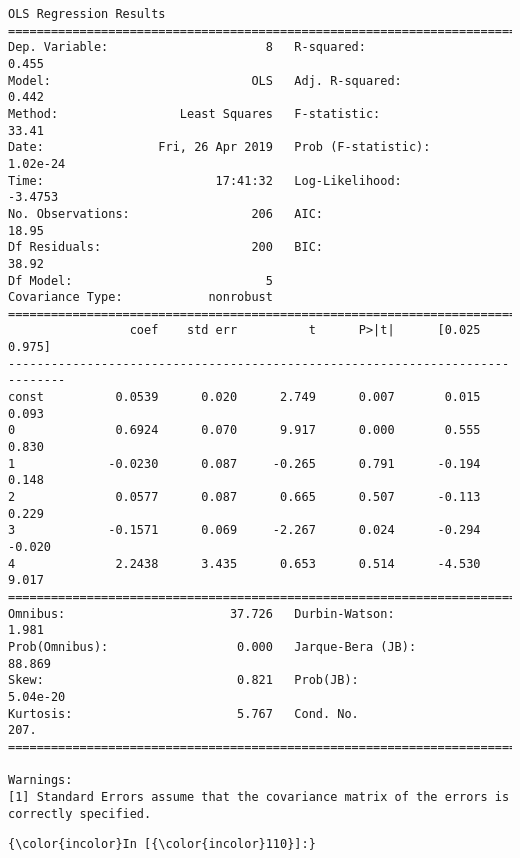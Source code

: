 \documentclass[11pt]{article}
\begin{document}
    \begin{Verbatim}[commandchars=\\\{\}]
                            OLS Regression Results                            
==============================================================================
Dep. Variable:                      8   R-squared:                       0.455
Model:                            OLS   Adj. R-squared:                  0.442
Method:                 Least Squares   F-statistic:                     33.41
Date:                Fri, 26 Apr 2019   Prob (F-statistic):           1.02e-24
Time:                        17:41:32   Log-Likelihood:                -3.4753
No. Observations:                 206   AIC:                             18.95
Df Residuals:                     200   BIC:                             38.92
Df Model:                           5                                         
Covariance Type:            nonrobust                                         
==============================================================================
                 coef    std err          t      P>|t|      [0.025      0.975]
------------------------------------------------------------------------------
const          0.0539      0.020      2.749      0.007       0.015       0.093
0              0.6924      0.070      9.917      0.000       0.555       0.830
1             -0.0230      0.087     -0.265      0.791      -0.194       0.148
2              0.0577      0.087      0.665      0.507      -0.113       0.229
3             -0.1571      0.069     -2.267      0.024      -0.294      -0.020
4              2.2438      3.435      0.653      0.514      -4.530       9.017
==============================================================================
Omnibus:                       37.726   Durbin-Watson:                   1.981
Prob(Omnibus):                  0.000   Jarque-Bera (JB):               88.869
Skew:                           0.821   Prob(JB):                     5.04e-20
Kurtosis:                       5.767   Cond. No.                         207.
==============================================================================

Warnings:
[1] Standard Errors assume that the covariance matrix of the errors is correctly specified.

    \end{Verbatim}

    \begin{Verbatim}[commandchars=\\\{\}]
{\color{incolor}In [{\color{incolor}110}]:} 
\end{Verbatim}
\end{document}
